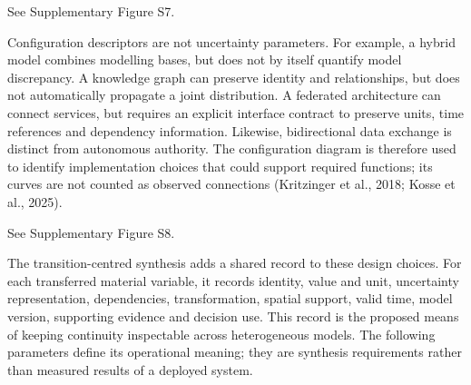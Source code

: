 See Supplementary Figure S7.

Configuration descriptors are not uncertainty parameters. For example, a hybrid model combines modelling bases, but does not by itself quantify model discrepancy. A knowledge graph can preserve identity and relationships, but does not automatically propagate a joint distribution. A federated architecture can connect services, but requires an explicit interface contract to preserve units, time references and dependency information. Likewise, bidirectional data exchange is distinct from autonomous authority. The configuration diagram is therefore used to identify implementation choices that could support required functions; its curves are not counted as observed connections (Kritzinger et al., 2018; Kosse et al., 2025).

See Supplementary Figure S8.

The transition-centred synthesis adds a shared record to these design choices. For each transferred material variable, it records identity, value and unit, uncertainty representation, dependencies, transformation, spatial support, valid time, model version, supporting evidence and decision use. This record is the proposed means of keeping continuity inspectable across heterogeneous models. The following parameters define its operational meaning; they are synthesis requirements rather than measured results of a deployed system.


